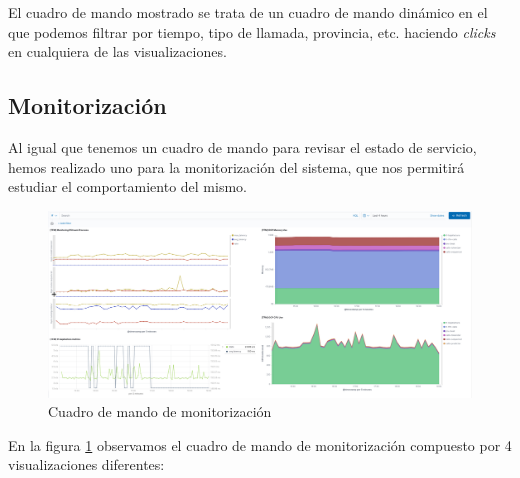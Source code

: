 El cuadro de mando mostrado se trata de un cuadro de mando dinámico en el que podemos filtrar por tiempo, tipo de llamada, provincia, etc. haciendo \textit{clicks} en cualquiera de las visualizaciones. 


\subsection{Monitorización}
Al igual que tenemos un cuadro de mando para revisar el estado de servicio, hemos realizado uno para la monitorización del sistema, que nos permitirá estudiar el comportamiento del mismo.

\begin{figure}[!ht]
	\centering
	\includegraphics[width=1\textwidth]{images/serv/CM-monitoring}
	\caption{Cuadro de mando de monitorización}
	\label{fig:cmmon}
\end{figure}

En la figura \ref{fig:cmmon} observamos el cuadro de mando de monitorización compuesto por 4 visualizaciones diferentes: 

